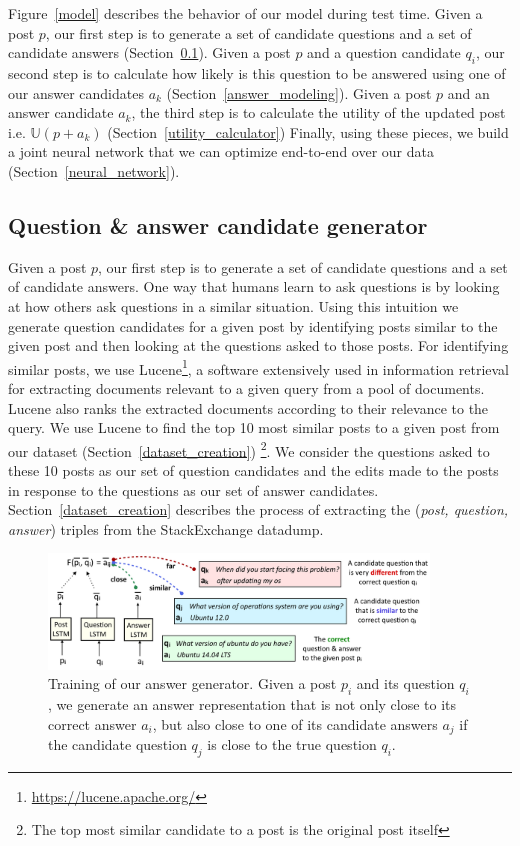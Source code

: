 \documentclass[11pt]{report}
\newcommand{\U}{\mathbb{U}}
\begin{document}
Figure~\ref{model} describes the behavior of our model during test time. 
Given a post $p$, our first step is to generate a set of candidate questions and a set of candidate answers (Section~\ref{question_candidate_generator}).
Given a post $p$ and a question candidate $q_i$, our second step is to calculate how likely is this question to be answered using one of our answer candidates $a_k$ (Section~\ref{answer_modeling}).
Given a post $p$ and an answer candidate $a_k$, the third step is to calculate the utility of the updated post i.e. $\U(p + a_k)$ (Section~\ref{utility_calculator})
Finally, using these pieces, we build a joint neural network that we can optimize end-to-end over our data (Section~\ref{neural_network}).

\subsection{Question \& answer candidate generator}\label{question_candidate_generator}

Given a post $p$, our first step is to generate a set of candidate questions and a set of candidate answers. One way that humans learn to ask questions is by looking at how others ask questions in a similar situation. Using this intuition we generate question candidates for a given post by identifying posts similar to the given post and then looking at the questions asked to those posts. For identifying similar posts, we use Lucene\footnote{\url{https://lucene.apache.org/}}, a software extensively used in information retrieval for extracting documents relevant to a given query from a pool of documents. Lucene also ranks the extracted documents according to their relevance to the query. We use Lucene to find the top 10 most similar posts to a given post from our dataset (Section~\ref{dataset_creation}) \footnote{The top most similar candidate to a post is the original post itself}. We consider the questions asked to these 10 posts as our set of question candidates and the edits made to the posts in response to the questions as our set of answer candidates. Section~\ref{dataset_creation} describes the process of extracting the (\textit{post, question, answer}) triples from the StackExchange datadump. 

\begin{figure}[ht]
\centering
\includegraphics[width=0.9\textwidth]{answer_generator}
\caption{Training of our answer generator. Given a post $p_i$ and its question $q_i$, we generate an answer representation that is not only close to its correct answer $a_i$, but also close to one of its candidate answers $a_j$ if the candidate question $q_j$ is close to the true question $q_i$.}
\label{fig_answer_generator}
\end{figure}
\end{document}
